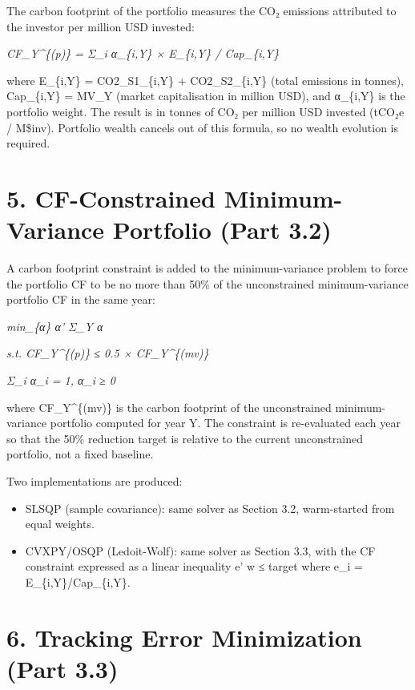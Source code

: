 \documentclass[
  11pt,
]{article}
\begin{document}
The carbon footprint of the portfolio measures the CO₂ emissions
attributed to the investor per million USD invested:

\emph{CF\_Y\^{}\{(p)\} = Σ\_i α\_\{i,Y\} × E\_\{i,Y\} / Cap\_\{i,Y\}}

where E\_\{i,Y\} = CO2\_S1\_\{i,Y\} + CO2\_S2\_\{i,Y\} (total emissions
in tonnes), Cap\_\{i,Y\} = MV\_Y (market capitalisation in million USD),
and α\_\{i,Y\} is the portfolio weight. The result is in tonnes of CO₂
per million USD invested (tCO₂e / M\$inv). Portfolio wealth cancels out
of this formula, so no wealth evolution is required.

\hypertarget{cf-constrained-minimum-variance-portfolio-part-3.2}{%
\section{5. CF-Constrained Minimum-Variance Portfolio (Part
3.2)}\label{cf-constrained-minimum-variance-portfolio-part-3.2}}

A carbon footprint constraint is added to the minimum-variance problem
to force the portfolio CF to be no more than 50\% of the unconstrained
minimum-variance portfolio CF in the same year:

\emph{min\_\{α\} α' Σ\_Y α}

\emph{s.t. CF\_Y\^{}\{(p)\} ≤ 0.5 × CF\_Y\^{}\{(mv)\}}

\emph{Σ\_i α\_i = 1, α\_i ≥ 0}

where CF\_Y\^{}\{(mv)\} is the carbon footprint of the unconstrained
minimum-variance portfolio computed for year Y. The constraint is
re-evaluated each year so that the 50\% reduction target is relative to
the current unconstrained portfolio, not a fixed baseline.

Two implementations are produced:

\begin{itemize}
\item
  SLSQP (sample covariance): same solver as Section 3.2, warm-started
  from equal weights.
\item
  CVXPY/OSQP (Ledoit-Wolf): same solver as Section 3.3, with the CF
  constraint expressed as a linear inequality e' w ≤ target where e\_i =
  E\_\{i,Y\}/Cap\_\{i,Y\}.
\end{itemize}

\hypertarget{tracking-error-minimization-part-3.3}{%
\section{6. Tracking Error Minimization (Part
3.3)}\label{tracking-error-minimization-part-3.3}}
\end{document}
